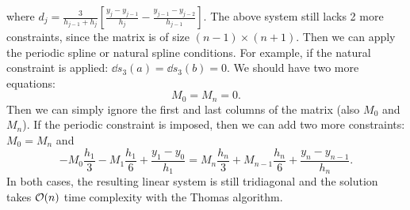 where $d_j = \frac{3}{h_{j-1} + h_{j}}\left[ \frac{y_{j} - y_{j-1}}{h_{j}} - \frac{y_{j-1} - y_{j-2}}{h_{j-1}}\right]$. 
The above system still lacks 2 more constraints, since the matrix is of size $(n-1)\times (n+1)$. Then we can apply the periodic spline or natural spline conditions. For example, if the natural constraint is applied: $\dd{s_3}(a) = \dd{s_3}(b) = 0$. We should have two more equations: 
\begin{equation}
    M_{0} = M_{n} = 0.
\end{equation} 
Then we can simply ignore the first and last columns of the matrix (also $M_0$ and $M_n$). 
If the periodic constraint is imposed, then we can add two more constraints: $M_0 = M_{n}$ and 
$$-M_0 \frac{h_{1}}{3} - M_1 \frac{h_1}{6} + \frac{y_1 - y_0}{h_1} = M_n \frac{h_n}{3} + M_{n-1} \frac{h_n}{6} + \frac{y_n - y_{n-1}}{h_n}.$$
In both cases, the resulting linear system is still tridiagonal and the solution takes $\mathcal O(n)$ time complexity with the Thomas algorithm. 


